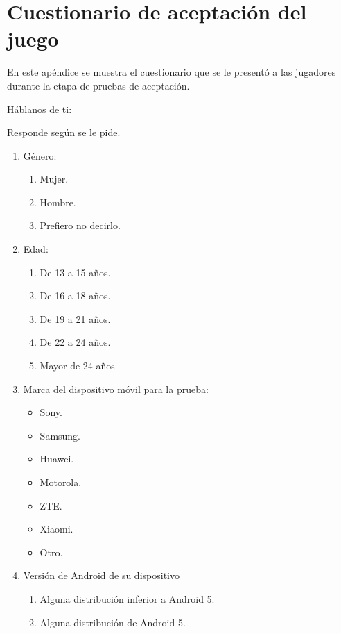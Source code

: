 \chapter{Cuestionario de aceptación del juego} \label{Anexo:Cuestionario}
En este apéndice se muestra el cuestionario que se le presentó a las jugadores durante la etapa de pruebas de aceptación.
\\
\par
Háblanos de ti:
\\
\par
Responde según se le pide.
\begin{enumerate}
    \item Género:
        \begin{enumerate}
            \item Mujer.
            \item Hombre.
            \item Prefiero no decirlo.
        \end{enumerate}
    \item Edad:
        \begin{enumerate}
            \item De 13 a 15 años.
            \item De 16 a 18 años.
            \item De 19 a 21 años.
            \item De 22 a 24 años.
            \item Mayor de 24 años
        \end{enumerate}
    \item Marca del dispositivo móvil para la prueba:
        \begin{itemize}
            \item Sony.
            \item Samsung.
            \item Huawei.
            \item Motorola.
            \item ZTE.
            \item Xiaomi.
            \item Otro.
        \end{itemize}
    \item Versión de Android de su dispositivo
        \begin{enumerate}
            \item Alguna distribución inferior a Android 5.
            \item Alguna distribución de Android 5.

\end{enumerate}
\end{enumerate}
